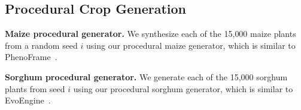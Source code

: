 \documentclass[10pt,twocolumn,letterpaper]{article}
\begin{document}
\subsection{Procedural Crop Generation}
\noindent\textbf{Maize procedural generator.}
We synthesize each of the 15{,}000 maize plants from a random seed $i$ using our procedural maize generator, which is similar to PhenoFrame~\citep{vazquez_phenoframe_2026}.

\noindent\textbf{Sorghum procedural generator.}
We generate each of the 15{,}000 sorghum plants from seed $i$ using our procedural sorghum generator, which is similar to EvoEngine~\citep{ostermann_sorghum_2024}.
\end{document}
